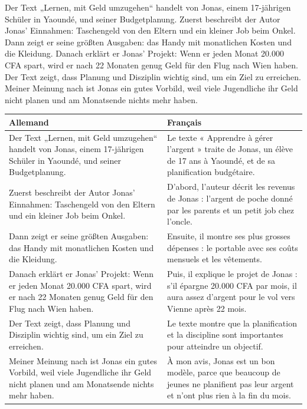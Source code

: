 \documentclass[11pt]{article}
\newcounter{popsec}
\newcounter{popsub}
\newcommand{\courssub}[1]{%
  \stepcounter{popsub}%
  \par\vspace{9pt}\noindent{\popxbold\fontsize{11.5}{13}\selectfont\color{popink}{\color{poporange}\thepopsec.\thepopsub}\hspace{6pt}#1}\par\nopagebreak\vspace{4pt}
}
\begin{document}
\courssub{Commentaire modèle}

\begin{textebox}
Der Text „Lernen, mit Geld umzugehen“ handelt von Jonas, einem 17-jährigen Schüler in Yaoundé, und seiner Budgetplanung. Zuerst beschreibt der Autor Jonas' Einnahmen: Taschengeld von den Eltern und ein kleiner Job beim Onkel. Dann zeigt er seine größten Ausgaben: das Handy mit monatlichen Kosten und die Kleidung. Danach erklärt er Jonas' Projekt: Wenn er jeden Monat 20.000 CFA spart, wird er nach 22 Monaten genug Geld für den Flug nach Wien haben. Der Text zeigt, dass Planung und Disziplin wichtig sind, um ein Ziel zu erreichen. Meiner Meinung nach ist Jonas ein gutes Vorbild, weil viele Jugendliche ihr Geld nicht planen und am Monatsende nichts mehr haben.
\end{textebox}

\begin{exemplebox}
\begin{tabular}{|p{7cm}|p{7cm}|}
\hline
\rowcolor{popblueL}
\textbf{Allemand} & \textbf{Français} \\
\hline
Der Text „Lernen, mit Geld umzugehen“ handelt von Jonas, einem 17-jährigen Schüler in Yaoundé, und seiner Budgetplanung. & Le texte « Apprendre à gérer l'argent » traite de Jonas, un élève de 17 ans à Yaoundé, et de sa planification budgétaire. \\
\hline
Zuerst beschreibt der Autor Jonas' Einnahmen: Taschengeld von den Eltern und ein kleiner Job beim Onkel. & D'abord, l'auteur décrit les revenus de Jonas : l'argent de poche donné par les parents et un petit job chez l'oncle. \\
\hline
Dann zeigt er seine größten Ausgaben: das Handy mit monatlichen Kosten und die Kleidung. & Ensuite, il montre ses plus grosses dépenses : le portable avec ses coûts mensuels et les vêtements. \\
\hline
Danach erklärt er Jonas' Projekt: Wenn er jeden Monat 20.000 CFA spart, wird er nach 22 Monaten genug Geld für den Flug nach Wien haben. & Puis, il explique le projet de Jonas : s'il épargne 20.000 CFA par mois, il aura assez d'argent pour le vol vers Vienne après 22 mois. \\
\hline
Der Text zeigt, dass Planung und Disziplin wichtig sind, um ein Ziel zu erreichen. & Le texte montre que la planification et la discipline sont importantes pour atteindre un objectif. \\
\hline
Meiner Meinung nach ist Jonas ein gutes Vorbild, weil viele Jugendliche ihr Geld nicht planen und am Monatsende nichts mehr haben. & À mon avis, Jonas est un bon modèle, parce que beaucoup de jeunes ne planifient pas leur argent et n'ont plus rien à la fin du mois. \\
\hline
\end{tabular}
\end{exemplebox}
\end{document}
